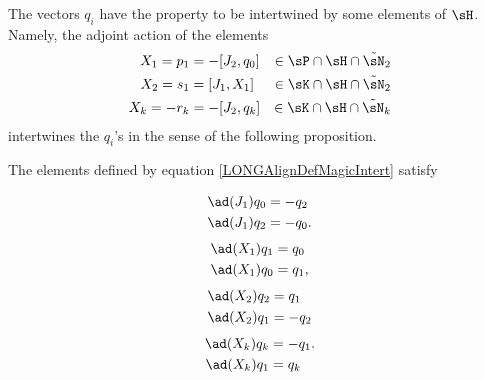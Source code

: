 The vectors $q_i$ have the property to be intertwined by some elements of $\sH$. Namely, the adjoint action of the elements
%
\begin{subequations}\label{LONGAlignDefMagicIntert}
	\begin{align}
		X_1=p_1&=-[J_2,q_0]	&\in\sP\cap\sH\cap\tilde\sN_2\\
		X_2=s_1&=[J_1,X_1]	&\in\sK\cap\sH\cap\tilde\sN_2\\
		X_k=-r_k&=-[J_2,q_k]	&\in\sK\cap\sH\cap\tilde\sN_k				\label{LONGEqDefXkCommeComm}
	\end{align}
\end{subequations}%
%
intertwines the $q_i$'s in the sense of the following proposition.
%
\begin{proposition}			\label{LONGXUnALaTwistingSuperCool}
	The elements defined by equation \eqref{LONGAlignDefMagicIntert} satisfy
	\begin{multicols}{2}
		\begin{subequations}				\label{LONGEqCalculBBBJUnUnNirme}
			\begin{align}
				\ad(J_1)q_0&=-q_2		\label{LONGEqCalculBBBJUnUnNirmeA}\\
				\ad(J_1)q_2&=-q_0.		\label{LONGEqCalculBBBJUnUnNirmeB}
			\end{align}
		\end{subequations}
		\begin{subequations}				\label{LONGEqSubEqbXUnqZero}
			\begin{align}
				\ad(X_1)q_1&=q_0		\label{LONGSubEqbXZeroqUn}\\
				\ad(X_1)q_0&=q_1,		\label{LONGSubEqbXUnqZero}
			\end{align}
		\end{subequations}
		\begin{subequations}
			\begin{align}
				\ad(X_2)q_2&=q_1		\label{LONGSubEqXdeuxQdeuxa}\\
				\ad(X_2)q_1&=-q_2		\label{LONGSubEqXdeuxQun}
			\end{align}
		\end{subequations}
		\begin{subequations}				\label{LONGEqSubEqbXkqZero}
			\begin{align}
				\ad(X_k)q_k&=-q_1.		\label{LONGSubEqbXIMoinsqZero}\\
				\ad(X_k)q_1&=q_k		\label{LONGSubEqbXkQunQk}
			\end{align}
		\end{subequations}
	\end{multicols}
\end{proposition}


